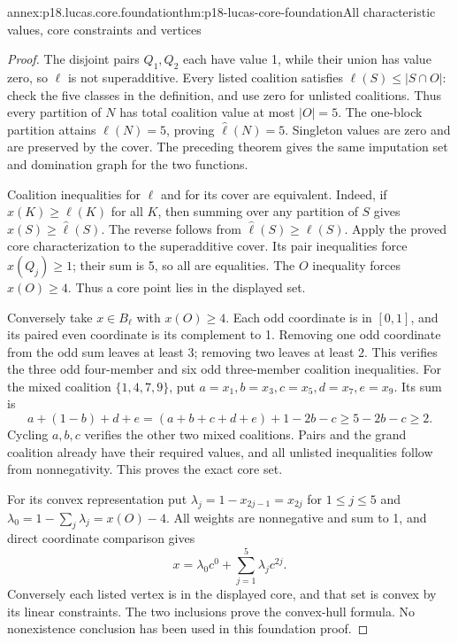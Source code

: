 \begin{annexitem}{annex:p18.lucas.core.foundation}{thm:p18-lucas-core-foundation}{All characteristic values, core constraints and vertices}
\begin{proof}
The disjoint pairs \(Q_1,Q_2\) each have value
1, while their union has value zero, so
\(\ell\) is not superadditive. Every listed
coalition satisfies
\(\ell(S)\leq|S\cap O|\): check the five
classes in the definition, and use zero
for unlisted coalitions. Thus every
partition of \(N\) has total coalition
value at most \(|O|=5\). The one-block
partition attains \(\ell(N)=5\), proving
\(\widehat\ell(N)=5\). Singleton values
are zero and are preserved by the
cover. The preceding theorem gives
the same imputation set and domination
graph for the two functions.

Coalition inequalities for \(\ell\) and
for its cover are equivalent. Indeed,
if \(x(K)\geq\ell(K)\) for all \(K\),
then summing over any partition of
\(S\) gives \(x(S)\geq\widehat\ell(S)\).
The reverse follows from
\(\widehat\ell(S)\geq\ell(S)\).
Apply the proved core characterization
to the superadditive cover. Its
pair inequalities force \(x(Q_j)\geq1\);
their sum is 5, so all are equalities.
The \(O\) inequality forces \(x(O)\geq4\).
Thus a core point lies in the
displayed set.

Conversely take \(x\in B_\ell\) with
\(x(O)\geq4\). Each odd coordinate
is in \([0,1]\), and its paired
even coordinate is its complement
to 1. Removing one odd coordinate
from the odd sum leaves at least
3; removing two leaves at least
2. This verifies the three
odd four-member and six odd
three-member coalition inequalities.
For the mixed coalition \(\{1,4,7,9\}\),
put \(a=x_1,b=x_3,c=x_5,d=x_7,e=x_9\).
Its sum is
\[
 a+(1-b)+d+e
     =(a+b+c+d+e)+1-2b-c\geq5-2b-c\geq2.
\]
Cycling \(a,b,c\) verifies the
other two mixed coalitions.
Pairs and the grand coalition
already have their required
values, and all unlisted
inequalities follow from
nonnegativity. This proves
the exact core set.

For its convex representation put
\(\lambda_j=1-x_{2j-1}=x_{2j}\)
for \(1\leq j\leq5\) and
\(\lambda_0=1-\sum_j\lambda_j=x(O)-4\).
All weights are nonnegative
and sum to 1, and direct
coordinate comparison gives
\[
                       x=\lambda_0c^0+\sum_{j=1}^5\lambda_jc^{2j}.
\]
Conversely each listed vertex
is in the displayed core,
and that set is convex
by its linear constraints.
The two inclusions prove
the convex-hull formula.
No nonexistence conclusion
has been used in this
foundation proof.
\end{proof}
\end{annexitem}
